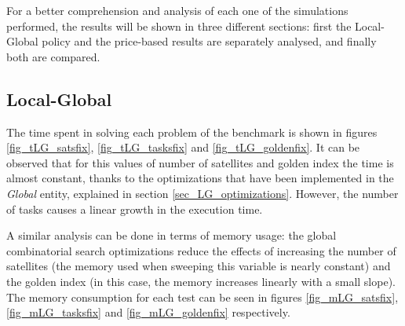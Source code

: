 For a better comprehension and analysis of each one of the simulations performed, the results will be shown in three different sections: first the Local-Global policy and the price-based results are separately analysed, and finally both are compared.

\subsection{Local-Global}

The time spent in solving each problem of the benchmark is shown in figures \ref{fig_tLG_satsfix}, \ref{fig_tLG_tasksfix} and \ref{fig_tLG_goldenfix}. It can be observed that for this values of number of satellites and golden index the time is almost constant, thanks to the optimizations that have been implemented in the \emph{Global} entity, explained in section \ref{sec_LG_optimizations}. However, the number of tasks causes a linear growth in the execution time.

A similar analysis can be done in terms of memory usage: the global combinatorial search optimizations reduce the effects of increasing the number of satellites (the memory used when sweeping this variable is nearly constant) and the golden index (in this case, the memory increases linearly with a small slope). The memory consumption for each test can be seen in figures \ref{fig_mLG_satsfix}, \ref{fig_mLG_tasksfix} and \ref{fig_mLG_goldenfix} respectively.

